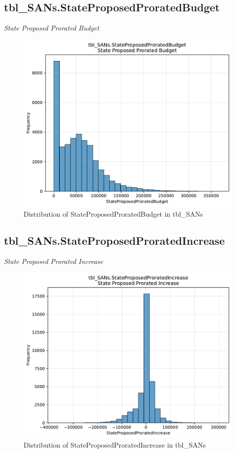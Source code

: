 \subsection{tbl\_SANs.StateProposedProratedBudget}
\textit{State Proposed Prorated Budget}

\begin{figure}[htbp]
\centering
\includegraphics[width=\textwidth]{figures/dbo_tbl_SANs_StateProposedProratedBudget.pdf}
\caption{Distribution of StateProposedProratedBudget in tbl\_SANs}
\end{figure}\newpage

\subsection{tbl\_SANs.StateProposedProratedIncrease}
\textit{State Proposed Prorated Increase}

\begin{figure}[htbp]
\centering
\includegraphics[width=\textwidth]{figures/dbo_tbl_SANs_StateProposedProratedIncrease.pdf}
\caption{Distribution of StateProposedProratedIncrease in tbl\_SANs}
\end{figure}\newpage

